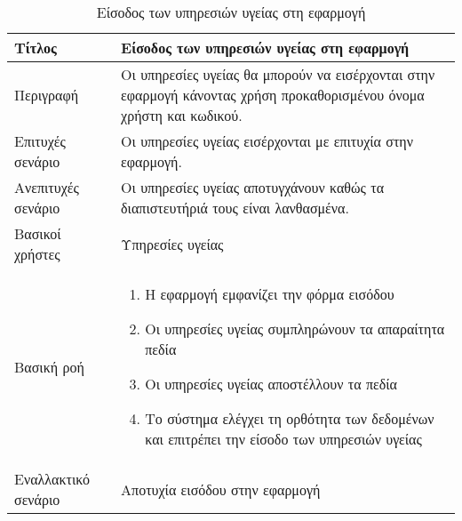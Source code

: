 \begin{table}[h]
 \caption{Είσοδος των υπηρεσιών υγείας στη εφαρμογή}
\begin{center}
\begin{tabular}{ | m{10em} |  m{25em} | } 
\hline
 Τίτλος & Είσοδος των υπηρεσιών υγείας στη εφαρμογή \\ 
\hline
 Περιγραφή & Οι υπηρεσίες υγείας θα μπορούν να εισέρχονται στην εφαρμογή κάνοντας χρήση προκαθορισμένου όνομα χρήστη και κωδικού.\\ 
\hline
 Επιτυχές σενάριο & Οι υπηρεσίες υγείας εισέρχονται με επιτυχία στην εφαρμογή.\\
\hline
 Ανεπιτυχές σενάριο  & Οι υπηρεσίες υγείας αποτυγχάνουν καθώς τα διαπιστευτήριά τους είναι λανθασμένα. \\ 
\hline
 Βασικοί χρήστες  & Υπηρεσίες υγείας \\ 
\hline
 Βασική ροή  & 
\begin{enumerate}
\item Η εφαρμογή εμφανίζει την φόρμα εισόδου
\item Οι υπηρεσίες υγείας συμπληρώνουν τα απαραίτητα πεδία
\item Οι υπηρεσίες υγείας αποστέλλουν τα πεδία
\item Το σύστημα ελέγχει τη ορθότητα των δεδομένων και επιτρέπει την είσοδο των υπηρεσιών υγείας
\end{enumerate}
 \\ 
\hline
 Εναλλακτικό σενάριο  & Αποτυχία εισόδου στην εφαρμογή \\ 
\hline
\end{tabular}
\end{center}
\end{table}



